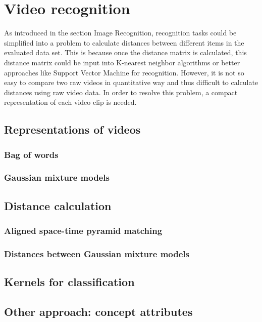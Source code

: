 \section {Video recognition}
As introduced in the section Image Recognition, recognition tasks could be simplified into a problem to calculate distances between different items in the evaluated data set. This is because once the distance matrix is calculated, this distance matrix could be input into K-nearest neighbor algorithms or better approaches like Support Vector Machine for recognition. However, it is not so easy to compare two raw videos in quantitative way and thus difficult to calculate distances using raw video data. In order to resolve this problem, a compact representation of each video clip is needed. 
\subsection{Representations of videos}
	\subsubsection{Bag of words}
	\subsubsection{Gaussian mixture models}
\subsection{Distance calculation}
	\subsubsection{Aligned space-time pyramid matching}
	\subsubsection{Distances between Gaussian mixture models}
\subsection{Kernels for classification}
\subsection{Other approach: concept attributes}


